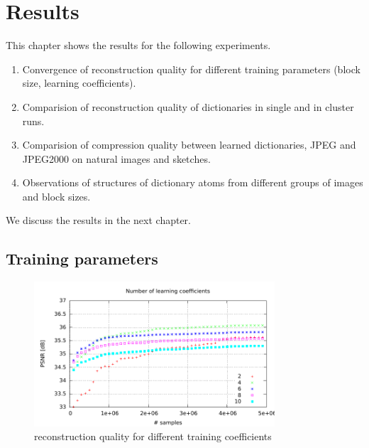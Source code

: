 \chapter{Results}
This chapter shows the results for the following experiments.
\begin{enumerate}
 \item Convergence of reconstruction quality for different training parameters
(block size, learning coefficients).
 \item Comparision of reconstruction quality of dictionaries
in single and in cluster runs. 
 \item Comparision of compression quality between learned dictionaries, JPEG and
JPEG2000  on natural images and sketches.
 \item Observations of structures of dictionary atoms from different
groups of images and block sizes.
\end{enumerate}

We discuss the results in the next chapter.

\newpage

\section{Training parameters}
\begin{figure}[h]
\centering
\includegraphics[width = 0.8\textwidth]{../tests/results/coeffsConverg.pdf}
\caption{reconstruction quality for different training coefficients}
\label{fig:dict size}
\end{figure}

